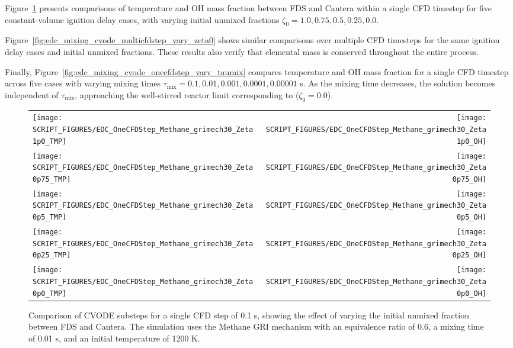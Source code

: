 \documentclass[11pt]{book}
\begin{document}
Figure~\ref{fig:edc_mixing_cvode_onecfdstep_vary_zeta0} presents comparisons of temperature and OH mass fraction between FDS and Cantera within a single CFD timestep for five constant-volume ignition delay cases, with varying initial unmixed fractions \(\zeta_0 = 1.0, 0.75, 0.5, 0.25, 0.0\).

Figure~\ref{fig:edc_mixing_cvode_multicfdstep_vary_zeta0} shows similar comparisons over multiple CFD timesteps for the same ignition delay cases and initial unmixed fractions. These results also verify that elemental mass is conserved throughout the entire process.

Finally, Figure~\ref{fig:edc_mixing_cvode_onecfdstep_vary_taumix} compares temperature and OH mass fraction for a single CFD timestep across five cases with varying mixing times \(\tau_{\text{mix}} = 0.1, 0.01, 0.001, 0.0001, 0.00001\) s. As the mixing time decreases, the solution becomes independent of \(\tau_{\text{mix}}\), approaching the well-stirred reactor limit corresponding to (\(\zeta_0 = 0.0\)).

\begin{figure}[p]
\begin{tabular*}{\textwidth}{lr}
\texttt{[image: SCRIPT\_FIGURES/EDC\_OneCFDStep\_Methane\_grimech30\_Zeta1p0\_TMP]} &
\texttt{[image: SCRIPT\_FIGURES/EDC\_OneCFDStep\_Methane\_grimech30\_Zeta1p0\_OH]} \\
\texttt{[image: SCRIPT\_FIGURES/EDC\_OneCFDStep\_Methane\_grimech30\_Zeta0p75\_TMP]} &
\texttt{[image: SCRIPT\_FIGURES/EDC\_OneCFDStep\_Methane\_grimech30\_Zeta0p75\_OH]} \\
\texttt{[image: SCRIPT\_FIGURES/EDC\_OneCFDStep\_Methane\_grimech30\_Zeta0p5\_TMP]} &
\texttt{[image: SCRIPT\_FIGURES/EDC\_OneCFDStep\_Methane\_grimech30\_Zeta0p5\_OH]} \\
\texttt{[image: SCRIPT\_FIGURES/EDC\_OneCFDStep\_Methane\_grimech30\_Zeta0p25\_TMP]} &
\texttt{[image: SCRIPT\_FIGURES/EDC\_OneCFDStep\_Methane\_grimech30\_Zeta0p25\_OH]} \\
\texttt{[image: SCRIPT\_FIGURES/EDC\_OneCFDStep\_Methane\_grimech30\_Zeta0p0\_TMP]} &
\texttt{[image: SCRIPT\_FIGURES/EDC\_OneCFDStep\_Methane\_grimech30\_Zeta0p0\_OH]} 
\end{tabular*}
\caption[Results of the  test cases]{Comparison of CVODE substeps for a single CFD step of 0.1 s, showing the effect of varying the initial unmixed fraction between FDS and Cantera. The simulation uses the Methane GRI mechanism with an equivalence ratio of 0.6, a mixing time of 0.01 s, and an initial temperature of 1200 K.}
\label{fig:edc_mixing_cvode_onecfdstep_vary_zeta0}
\end{figure}
\end{document}
